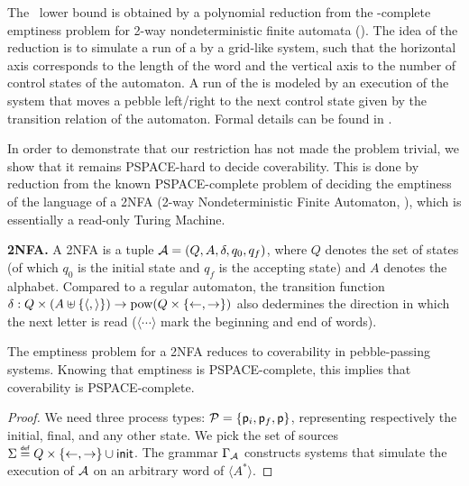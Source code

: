 The \pspace\ lower bound is obtained by a polynomial reduction from
the \pspace-complete emptiness problem for 2-way nondeterministic
finite automata (\twonfa). The idea of the reduction is to simulate a
run of a \twonfa{} by a grid-like system, such that the horizontal
axis corresponds to the length of the word and the vertical axis to
the number of control states of the automaton. A run of the \twonfa{}
is modeled by an execution of the system that moves a pebble
left/right to the next control state given by the transition relation
of the automaton. \ifLongVersion\else
Formal details can be found in . 
\fi

\begin{textAtEnd}[category=hardness]

In order to demonstrate that our restriction has not made the problem
trivial, we show that it remains \textsf{PSPACE}-hard to decide
coverability.  This is done by reduction from the known
\textsf{PSPACE}-complete problem of deciding the emptiness of the
language of a 2NFA (2-way Nondeterministic Finite Automaton,
\cite{2nfa}), which is essentially a read-only Turing Machine.

\begin{definition}{\textbf{2NFA.}}
  A 2NFA is a tuple $\mathcal{A} = (Q, A, \delta, q_0, q_f)$,
  where $Q$ denotes the set of states (of which $q_0$ is the initial state
  and $q_f$ is the accepting state)
  and $A$ denotes the alphabet.
  Compared to a regular automaton, the transition function
  $\delta : Q \times (A \uplus {\{ {\langle,\rangle} \}}) \to {\mathrm{pow}({Q \times {\{ {\leftarrow, \rightarrow} \}}})}$
  also dedermines the direction in which the next letter is read
  ($\langle \cdots \rangle$ mark the beginning and end of words).
\end{definition}

\begin{lemma}
  The emptiness problem for a 2NFA reduces to coverability in pebble-passing systems.
  Knowing that emptiness is \textsf{PSPACE}-complete, this implies that
  coverability is \textsf{PSPACE}-complete.
\end{lemma}
\begin{proof}
  We need three process types: $\mathcal{P} = {\{ {\mathsf{p}_i, \mathsf{p}_f, \mathsf{p}} \}}$,
  representing respectively the initial, final, and any other state.
  We pick the set of sources $\Sigma \stackrel{\scriptscriptstyle{\mathsf{def}}}{=} Q \times {\{ {\leftarrow, \rightarrow} \}} \cup {\mathsf{init}}$.
  The grammar $\Gamma_{\mathcal{A}}$ constructs systems that simulate the execution
  of $\mathcal{A}$ on an arbitrary word of $\langle A^* \rangle$.


\end{proof}
\end{textAtEnd}
